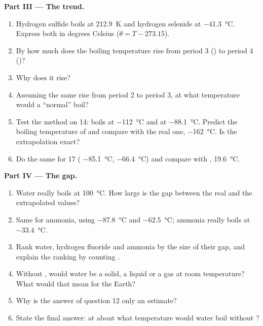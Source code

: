 \begin{problem}
\medskip
\noindent\textbf{Part III --- The trend.}
\begin{enumerate}[resume]
  \item Hydrogen sulfide boils at \qty{212.9}{K} and hydrogen selenide at
        \qty{-41.3}{\celsius}. Express both in degrees Celsius
        ($\theta = T - 273.15$).
  \item By how much does the boiling temperature rise from period 3
        () to period 4 ()?
  \item Why does it rise?
  \item Assuming the same rise from period 2 to period 3, at what
        temperature would a ``normal''  boil?
  \item Test the method on  14:  boils at
        \qty{-112}{\celsius} and  at \qty{-88.1}{\celsius}.
        Predict the boiling temperature of  and compare with the
        real one, \qty{-162}{\celsius}. Is the extrapolation exact?
  \item Do the same for  17 ( \qty{-85.1}{\celsius},
         \qty{-66.4}{\celsius}) and compare with ,
        \qty{19.6}{\celsius}.
\end{enumerate}

\medskip
\noindent\textbf{Part IV --- The gap.}
\begin{enumerate}[resume]
  \item Water really boils at \qty{100}{\celsius}. How large is the gap
        between the real and the extrapolated values?
  \item Same for ammonia, using  \qty{-87.8}{\celsius} and
         \qty{-62.5}{\celsius}; ammonia really boils at
        \qty{-33.4}{\celsius}.
  \item Rank water, hydrogen fluoride and ammonia by the size of their
        gap, and explain the ranking by counting .
  \item Without , would water be a solid, a liquid or a gas
        at room temperature? What would that mean for the Earth?
  \item Why is the answer of question 12 only an estimate?
  \item State the final answer: at about what temperature would water
        boil without ?
\end{enumerate}
\end{problem}
